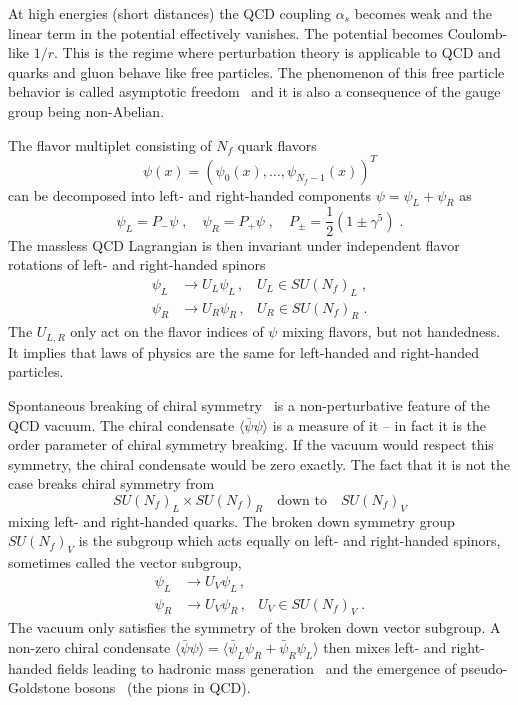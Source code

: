 At high energies (short distances) the QCD coupling $\alpha_s$ becomes weak and the linear term in the potential effectively vanishes.
The potential becomes Coulomb-like $1/r$.
This is the regime where perturbation theory is applicable to QCD and quarks and gluon behave like free particles.
The phenomenon of this free particle behavior is called asymptotic freedom~\cite{PhysRevLett.30.1343,PhysRevLett.30.1346} and it is also a consequence of the gauge group being non-Abelian.


The flavor multiplet consisting of $N_f$ quark flavors
\begin{equation}
\psi(x) = ( \psi_0(x), \ldots, \psi_{N_f-1}(x) )^{T}
\end{equation}
can be decomposed into left- and right-handed components $\psi = \psi_L + \psi_R$ as
\begin{equation}
\psi_L = P_{-} \psi \;,
\quad
\psi_R = P_{+} \psi \;,
\quad
P_{\pm} = \frac{1}{2} ( 1 \pm \gamma^{5}) \;.
\end{equation}
The massless QCD Lagrangian is then invariant under independent flavor rotations of left- and right-handed spinors
\begin{align}
\psi_L &\rightarrow U_L \psi_L \,, &U_L \in SU(N_f)_L \;, \\
\psi_R &\rightarrow U_R \psi_R \,, &U_R \in SU(N_f)_R \;.
\end{align}
The $U_{L,R}$ only act on the flavor indices of $\psi$ mixing flavors, but not handedness.
It implies that laws of physics are the same for left-handed and right-handed particles.

Spontaneous breaking of chiral symmetry~\cite{PhysRev.117.648} is a non-perturbative feature of the QCD vacuum.
The chiral condensate $\langle \bar{\psi} \psi \rangle$ is a measure of it -- in fact it is the order parameter of chiral symmetry breaking.
If the vacuum would respect this symmetry, the chiral condensate would be zero exactly.
The fact that it is not the case breaks chiral symmetry from
\begin{equation}
SU(N_f)_L \times SU(N_f)_R
\quad
\text{down to}
\quad
SU(N_f)_V
\end{equation}
mixing left- and right-handed quarks.
The broken down symmetry group $SU(N_f)_V$ is the subgroup which acts equally on left- and right-handed spinors, sometimes called the vector subgroup,
\begin{align}
\psi_L &\rightarrow U_V \psi_L \,, \\
\psi_R &\rightarrow U_V \psi_R \,, &U_V \in SU(N_f)_V \;.
\end{align}
The vacuum only satisfies the symmetry of the broken down vector subgroup.
A non-zero chiral condensate $\langle \bar{\psi} \psi \rangle = \langle \bar{\psi}_L \psi_R + \bar{\psi}_R \psi_L \rangle$ then mixes left- and right-handed fields leading to hadronic mass generation~\cite{PhysRev.122.345} and the emergence of pseudo-Goldstone bosons~\cite{Nambu:1960xd,Goldstone:1961eq,PhysRev.127.965} (the pions in QCD).

